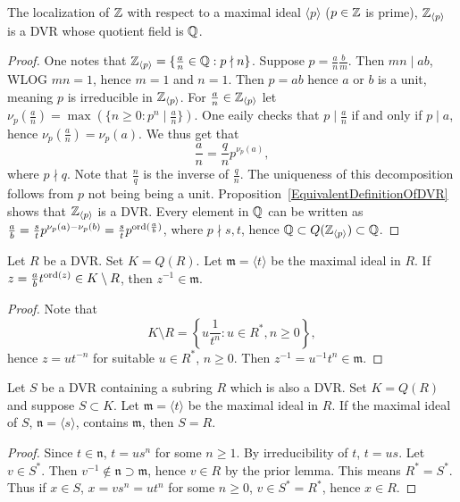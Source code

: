     \begin{proposition}
        The localization of $\mathbb{Z}$ with respect to a maximal ideal $\langle p\rangle$ ($p\in \mathbb{Z}$ is prime), $\mathbb{Z}_{\langle p\rangle}$ is a DVR whose quotient field is $\mathbb{Q}$.
    \end{proposition}
    \begin{proof}
        One notes that $\mathbb{Z}_{\langle p\rangle} = \{\frac{a}{n}\in \mathbb{Q} : p\nmid n\}$. Suppose $p = \frac{a}{n}\frac{b}{m}$. Then $mn\mid ab$, WLOG $mn=1$, hence $m=1$ and $n=1$. Then $p=ab$ hence $a$ or $b$ is a unit, meaning $p$ is irreducible in $\mathbb{Z}_{\langle p\rangle}$. For $\frac{a}{n}\in \mathbb{Z}_{\langle p\rangle}$ let $\nu_p\left(\frac{a}{n}\right)=\max(\{n\geq 0 : p^n\mid \frac{a}{n}\}).$ One eaily checks that $p\mid \frac{a}{n}$ if and only if $p\mid a$, hence $\nu_p(\frac{a}{n})=\nu_p(a).$ We thus get that 
        $$\frac{a}{n} = \frac{q}{n}p^{\nu_p(a)},$$
        where $p\nmid q$. Note that $\frac{n}{q}$ is the inverse of $\frac{q}{n}$. The uniqueness of this decomposition follows from $p$ not being being a unit. Proposition~\ref{EquivalentDefinitionOfDVR} shows that $\mathbb{Z}_{\langle p\rangle}$ is a DVR. Every element in $\mathbb{Q}$ can be written as $\frac{a}{b}=\frac{s}{t}p^{\nu_p(a)-\nu_p(b)} = \frac{s}{t}p^{\mathrm{ord}(\frac{a}{b})}$, where $p\nmid s,t$, hence $\mathbb{Q} \subset Q(\mathbb{Z}_{\langle p\rangle })\subset \mathbb{Q}$.
    \end{proof}
    \begin{lemma}\label{InversesOfNonRingElementsInQuotientFieldOfDVR}
        Let $R$ be a DVR. Set $K=Q(R)$. Let $\mathfrak{m}=\langle t\rangle$ be the maximal ideal in $R$. If $z = \frac{a}{b}t^{\mathrm{ord}(z)}\in K\setminus R$, then $z^{-1}\in \mathfrak{m}$.
    \end{lemma}
    \begin{proof}
        Note that 
        $$K\setminus R = \left\{u\frac{1}{t^{n}} : u\in R^\ast, n\geq 0\right\},$$
        hence $z=ut^{-n}$ for suitable $u\in R^\ast$, $n\geq0$. Then $z^{-1}=u^{-1}t^n\in\mathfrak{m}$.
    \end{proof}
    \begin{proposition}\label{UniquenessPropertyOfDVRs}
        Let $S$ be a DVR containing a subring $R$ which is also a DVR. Set $K=Q(R)$ and suppose $S\subset K$. Let $\mathfrak{m}=\langle t\rangle$ be the maximal ideal in $R$. If the maximal ideal of $S$, $\mathfrak{n}=\langle s\rangle$, contains $\mathfrak{m}$, then $S=R$.
    \end{proposition}
    \begin{proof}
        Since $t\in \mathfrak{n}$, $t = us^n$ for some $n\geq 1$. By irreducibility of $t$, $t=us$. Let $v\in S^\ast$. Then $v^{-1}\notin \mathfrak{n}\supset \mathfrak{m}$, hence $v\in R$ by the prior lemma. This means $R^\ast=S^\ast$. Thus if $x\in S$, $x=vs^n=ut^n$ for some $n\geq0$, $v\in S^\ast=R^\ast$, hence $x\in R$.
    \end{proof}
